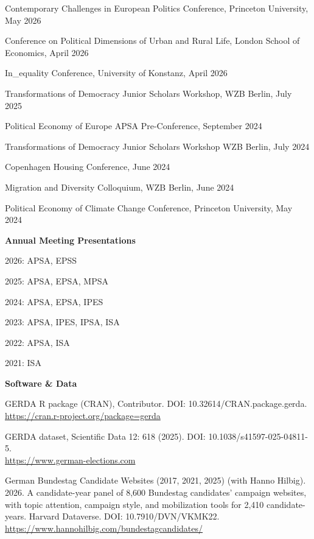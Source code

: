 \documentclass[letterpaper,10pt,oneside]{article}
\begin{document}
Contemporary Challenges in European Politics Conference, Princeton University, May 2026

Conference on Political Dimensions of Urban and Rural Life, London School of Economics, April 2026

In\_equality Conference, University of Konstanz, April 2026

Transformations of Democracy Junior Scholars Workshop, WZB Berlin, July 2025

Political Economy of Europe APSA Pre-Conference, September 2024

Transformations of Democracy Junior Scholars Workshop WZB Berlin, July 2024

Copenhagen Housing Conference, June 2024

Migration and Diversity Colloquium, WZB Berlin, June 2024

Political Economy of Climate Change Conference, Princeton University, May 2024

\newpage

{\large \textbf{Annual Meeting Presentations}}

2026: APSA, EPSS

2025: APSA, EPSA, MPSA

2024: APSA, EPSA, IPES

2023: APSA, IPES, IPSA, ISA

2022: APSA, ISA

2021: ISA

\vspace{2ex}

{\large \textbf{Software \& Data}}

 GERDA \textsf{R} package (CRAN), Contributor. DOI: 10.32614/CRAN.package.gerda.\\ \url{https://cran.r-project.org/package=gerda}

 GERDA dataset, Scientific Data 12: 618 (2025). DOI: 10.1038/s41597-025-04811-5.\\ \url{https://www.german-elections.com}

 German Bundestag Candidate Websites (2017, 2021, 2025) (with Hanno Hilbig). 2026. A candidate-year panel of 8,600 Bundestag candidates' campaign websites, with topic attention, campaign style, and mobilization tools for 2,410 candidate-years. Harvard Dataverse. DOI: 10.7910/DVN/VKMK22.\\ \url{https://www.hannohilbig.com/bundestagcandidates/}

\vspace{2ex}
\end{document}
